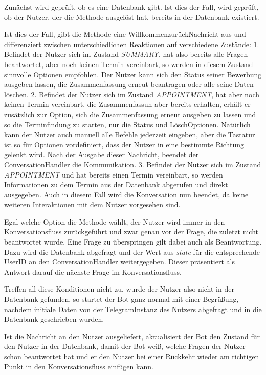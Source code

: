             Zunächst wird geprüft, ob es eine Datenbank gibt. Ist dies der Fall, wird geprüft, ob der Nutzer, der die Methode ausgelöst hat, bereits in der Datenbank existiert. 
            
            Ist dies der Fall, gibt die Methode eine Willkommen\-zurück\-Nachricht aus und differenziert zwischen unterschiedlichen Reaktionen auf verschiedene Zustände:
            1. Befindet der Nutzer sich im Zustand \emph{SUMMARY}, hat also bereits alle Fragen beantwortet, aber noch keinen Termin vereinbart, so werden in diesem Zustand sinnvolle Optionen empfohlen. Der Nutzer kann sich den Status seiner Bewerbung ausgeben lassen, die Zusammenfassung erneut beantragen oder alle seine Daten löschen. 
            2.  Befindet der Nutzer sich im Zustand \emph{APPOINTMENT}, hat aber noch keinen Termin vereinbart, die Zusammenfassun aber bereits erhalten, erhält er zusätzlich zur Option, sich die Zusammenfassung erneut ausgeben zu lassen und so die Terminfindung zu starten, nur die Status\- und Lösch\-Optionen. Natürlich kann der Nutzer auch manuell alle Befehle jederzeit eingeben, aber die Tastatur ist so für Optionen vordefiniert, dass der Nutzer in eine bestimmte Richtung gelenkt wird. Nach der Ausgabe dieser Nachricht, beendet der ConversationHandler die Kommunikation. 
            3. Befindet der Nutzer sich im Zustand \emph{APPOINTMENT} und hat bereits einen Termin vereinbart, so werden Informationen zu dem Termin aus der Datenbank abgerufen und direkt ausgegeben. Auch in diesem Fall wird die Konversation nun beendet, da keine weiteren Interaktionen mit dem Nutzer vorgesehen sind.

            Egal welche Option die Methode wählt, der Nutzer wird immer in den Konversationsfluss zurückgeführt und zwar genau vor der Frage, die zuletzt nicht beantwortet wurde. Eine Frage zu überspringen gilt dabei auch als Beantwortung. Dazu wird die Datenbank abgefragt und der Wert aus \emph{state} für die entsprechende User\-ID an den ConversationHandler weitergegeben. Dieser präsentiert als Antwort darauf die nächste Frage im Konversationsfluss.

            Treffen all diese Konditionen nicht zu, wurde der Nutzer also nicht in der Datenbank gefunden, so startet der Bot ganz normal mit einer Begrüßung, nachdem initiale Daten von der Telegram\-Instanz des Nutzers abgefragt und in die Datenbank geschrieben wurden. 

            Ist die Nachricht an den Nutzer ausgeliefert, aktualisiert der Bot den Zustand für den Nutzer in der Datenbank, damit der Bot weiß, welche Fragen der Nutzer schon beantwortet hat und er den Nutzer bei einer Rückkehr wieder am richtigen Punkt in den Konversationsfluss einfügen kann.

